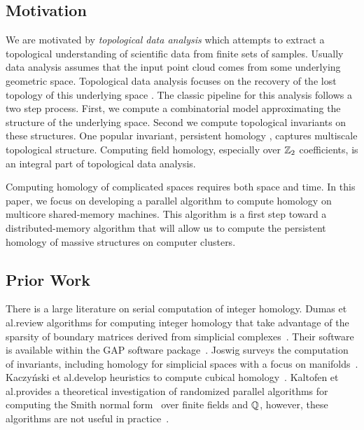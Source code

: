 \documentclass{jocg}
\begin{document}
\subsection{Motivation}
We are motivated by \emph{topological data analysis} 
which attempts to extract a topological understanding of scientific data from 
finite sets of samples. Usually data analysis assumes that the input point cloud
comes from some underlying geometric space. Topological data analysis focuses on
the recovery of the lost topology of this underlying space \cite{c-tnd-09}. 
The classic pipeline for this analysis follows a two step process. First, we 
compute a combinatorial model approximating the structure of the underlying 
space. Second we compute topological invariants on these structures. One popular
invariant, persistent homology \cite{elz-tps-02, zc-cph-05}, captures multiscale
topological structure. Computing field homology, 
especially over $\mathbb{Z}_2$ coefficients, is an integral part of topological data 
analysis.

Computing homology of complicated spaces requires both space and time. 
In this paper, we focus on developing a parallel algorithm to compute homology 
on multicore shared-memory machines.  
This algorithm is a first step toward a 
distributed-memory algorithm that will allow us to compute the persistent homology of 
massive structures on computer clusters.

\subsection{Prior Work}
There is a large literature on serial computation of integer homology.
Dumas et al.\@ review algorithms for computing integer homology that take 
advantage of the sparsity of boundary matrices derived from simplicial 
complexes~\cite{d-snf-03}. Their software is available within the GAP software 
package~\cite{GAP4}. Joswig surveys the computation of invariants, including 
homology for simplicial spaces with a focus on manifolds~\cite{j-csm-04}.
Kaczy{\'n}ski et al.\@ develop heuristics to compute cubical 
homology~\cite{kmm-ch-04}. Kaltofen et al.\@ provides a theoretical
investigation of randomized parallel algorithms for computing the Smith normal 
form~\cite{kks-snf-87,kks-snf-89} over finite fields and $\mathbb{Q}$, however, 
these algorithms are not useful in practice~\cite{ProofByAuthority}.
\end{document}
